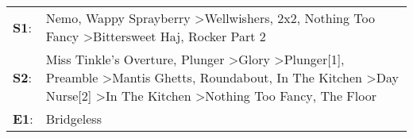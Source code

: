\begin{supertabular}{p{0.03\textwidth}p{0.92\textwidth}}
 \textbf{S1}:  &                                                                                                                                                                                                                                                                 Nemo\textsuperscript{}, \enspace Wappy Sprayberry\textsuperscript{} \textgreater \enspace Wellwishers\textsuperscript{}, \enspace 2x2\textsuperscript{}, \enspace Nothing Too Fancy\textsuperscript{} \textgreater \enspace Bittersweet Haj\textsuperscript{}, \enspace Rocker Part 2\textsuperscript{}  \enspace  \\
 \textbf{S2}:  &  Miss Tinkle's Overture\textsuperscript{}, \enspace Plunger\textsuperscript{} \textgreater \enspace Glory\textsuperscript{} \textgreater \enspace Plunger[1]\textsuperscript{}, \enspace Preamble\textsuperscript{} \textgreater \enspace Mantis Ghetts\textsuperscript{}, \enspace Roundabout\textsuperscript{}, \enspace In The Kitchen\textsuperscript{} \textgreater \enspace Day Nurse[2]\textsuperscript{} \textgreater \enspace In The Kitchen\textsuperscript{} \textgreater \enspace Nothing Too Fancy\textsuperscript{}, \enspace The Floor\textsuperscript{}  \enspace  \\
 \textbf{E1}:  &                                                                                                                                                                                                                                                                                                                                                                                                                                                                                                                                            Bridgeless\textsuperscript{}  \enspace  \\
\end{supertabular}
